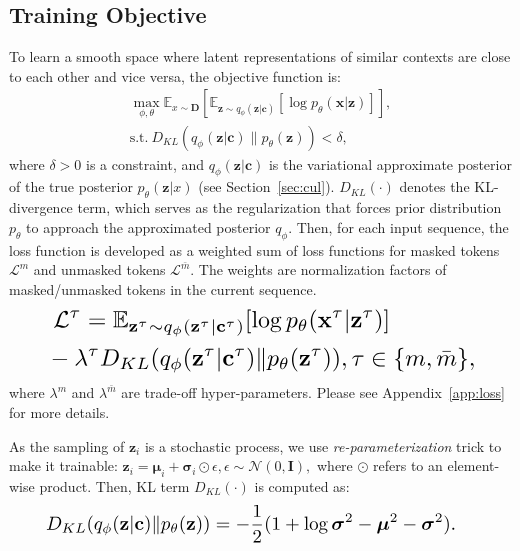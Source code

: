 \documentclass[11pt]{article}
\begin{document}
\subsection{Training Objective}
To learn a smooth space where latent representations of similar contexts are close to each other and vice versa, the objective function is:
\begin{equation}
\begin{split}
    \max_{\phi, \theta} \mathbb{E}_{
    {x} \sim \mathbf{D}
    }[\mathbb{E}_{
    \mathbf{z} \sim q_{\phi}(\mathbf{z} | \mathbf{c})
    } 
    [\log p_\theta (\mathbf{x} | \mathbf{z})]],
    \\ 
    \text{s.t.} \ D_{KL}( 
            q_{\phi}(\mathbf{z} | \mathbf{c}) 
            \|
            p_{\theta}(\mathbf{z}))  < \delta,
\end{split}
\end{equation}
where $\delta>0$ is a constraint, and 
$q_\phi(\mathbf{z} | \mathbf{c}) $ is the variational approximate posterior of the true posterior $p_{\theta}(\mathbf{z} | {x})$ (see Section~\ref{sec:cul}).
$D_{KL}(\cdot)$ denotes the KL-divergence term, which serves as the regularization that forces prior distribution $p_{\theta}$ to approach the approximated posterior $q_{\phi}$.
Then, for each input sequence, the loss function is developed as a weighted sum of loss functions for masked tokens $\mathcal{L}^{{m}}$ and unmasked tokens $\mathcal{L}^{\bar{m}}$.
The weights are normalization factors of masked/unmasked tokens in the current sequence. 
\begin{equation}
  \resizebox{0.89\linewidth}{!}{$
\begin{split}      
& \ \mathcal{L}^{\tau} =  \mathbb{E}_{ \mathbf{z}^{\tau} \sim q_{\phi}(\mathbf{z}^{\tau} | \mathbf{c}^{\tau}) }[\log p_\theta (\mathbf{x}^{\tau} | \mathbf{z}^{\tau})]        \\
&  - \lambda^{\tau}  D_{KL}( q_{\phi}(\mathbf{z}^{{\tau}} | \mathbf{c}^{{\tau}}) \| p_{\theta}(\mathbf{z}^{{\tau}}) ), \tau \in \{ m, \bar{m}\},
  \\ 
\end{split}
$}
\end{equation}
where $\lambda^{m}$ and $\lambda^{\bar{m}}$ are trade-off hyper-parameters.
Please see Appendix~\ref{app:loss} for more details.

As the sampling of $\mathbf{z}_i$ is a stochastic process, we use  \textit{re-parameterization} trick \cite{DBLP:journals/corr/KingmaW13} to make it trainable:
    $\mathbf{z}_i =  \boldsymbol{\mu}_i +  \boldsymbol{\sigma}_i  \odot \epsilon,  \epsilon \sim \mathcal{N}(0, \mathbf{I}),
    $
where $\odot$ refers to an element-wise product.
Then, KL term  $D_{KL}(\cdot)$  is computed as:
\begin{equation}
\resizebox{0.89\linewidth}{!}{$
\begin{split}
    D_{KL}( 
            q_{\phi} &
            (\mathbf{z}  | \mathbf{c}) 
            \| 
           p_{\theta}(\mathbf{z})
           )  =   -\frac{1}{2} (1 + \log \boldsymbol{\sigma}^2 - \boldsymbol{\mu}^2 - \boldsymbol{\sigma}^2  ). 
\end{split}
$}
\end{equation}
\end{document}

